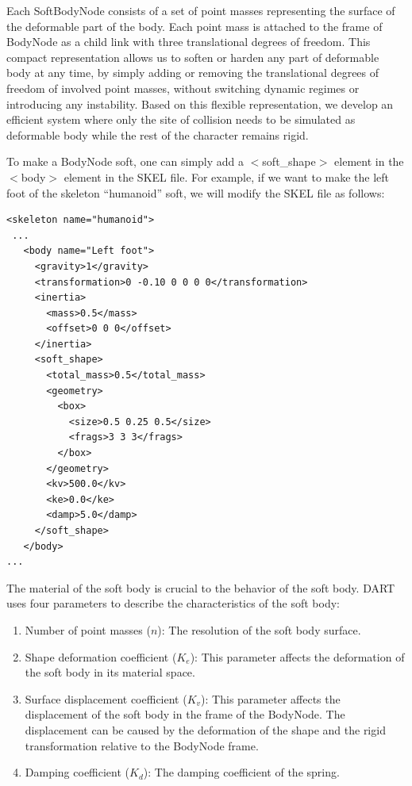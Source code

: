 Each SoftBodyNode consists of a set of point masses representing the
surface of the deformable part of the body. Each point mass is
attached to the frame of BodyNode as a child link with three translational
degrees of freedom. This compact representation allows us to soften or
harden any part of deformable body at any time, by simply adding or
removing the translational degrees of freedom of involved point
masses, without switching dynamic regimes or introducing any
instability. Based on this flexible representation, we develop an
efficient system where only the site of collision needs to be
simulated as deformable body while the rest of the character remains
rigid.

To make a BodyNode soft, one can simply add a
$<$soft\_shape$>$ element in the $<$body$>$ element in the SKEL file. For
example, if we want to make the left foot of the skeleton
``humanoid'' soft, we will modify the SKEL file as follows:

\begin{lstlisting}[caption=Joint.h]
 <skeleton name="humanoid">
 ...
   <body name="Left foot">
     <gravity>1</gravity>
     <transformation>0 -0.10 0 0 0 0</transformation>
     <inertia>
       <mass>0.5</mass>
       <offset>0 0 0</offset>
     </inertia>
     <soft_shape>
       <total_mass>0.5</total_mass>
       <geometry>
         <box>
           <size>0.5 0.25 0.5</size>
           <frags>3 3 3</frags>
         </box>
       </geometry>
       <kv>500.0</kv>
       <ke>0.0</ke>
       <damp>5.0</damp>
     </soft_shape>
   </body>
...
\end{lstlisting}

The material of the soft body is crucial to the behavior of the soft
body. DART uses four parameters to describe the characteristics of the
soft body:

\begin{enumerate}
\item{Number of point masses ($n$):} The resolution of the soft body surface. 
\item{Shape deformation coefficient ($K_e$):} This parameter
  affects the deformation of the soft body in its material space. 
\item{Surface displacement coefficient ($K_v$)}: This parameter
  affects the displacement of the soft body in the frame of the
  BodyNode. The displacement can be caused by the deformation of the
  shape and the rigid transformation relative to the BodyNode frame.
\item{Damping coefficient ($K_d$):} The damping coefficient of the spring.
\end{enumerate}


